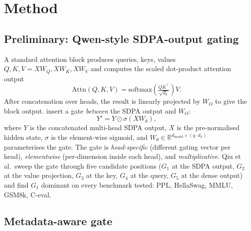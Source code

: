 \section{Method}
\label{sec:method}

\subsection{Preliminary: Qwen-style SDPA-output gating}
\label{subsec:qwen-gate}

A standard attention block produces queries, keys, values
$Q,K,V = XW_Q, XW_K, XW_V$ and computes the scaled dot-product
attention output
\begin{equation}
  \text{Attn}(Q,K,V) = \text{softmax}\!\left(\tfrac{QK^\top}{\sqrt{d_k}}\right) V.
  \label{eq:sdpa}
\end{equation}
After concatenation over heads, the result is linearly projected by
$W_O$ to give the block output. \citet{qiu2025gated} insert a gate
\emph{between} the SDPA output and $W_O$:
\begin{equation}
  Y' = Y \odot \sigma(X W_\theta),
  \label{eq:qwen-gate}
\end{equation}
where $Y$ is the concatenated multi-head SDPA output, $X$ is the
pre-normalised hidden state, $\sigma$ is the element-wise sigmoid, and
$W_\theta \in \mathbb{R}^{d_\text{model} \times (q \cdot d_k)}$
parameterises the gate. The gate is \emph{head-specific} (different
gating vector per head), \emph{elementwise} (per-dimension inside each
head), and \emph{multiplicative}. Qiu et al.~sweep the gate through
five candidate positions ($G_1$ at the SDPA output, $G_2$ at the value
projection, $G_3$ at the key, $G_4$ at the query, $G_5$ at the dense
output) and find $G_1$ dominant on every benchmark tested: PPL,
HellaSwag, MMLU, GSM8k, C-eval.

\subsection{Metadata-aware gate}
\label{subsec:metadata-gate}


